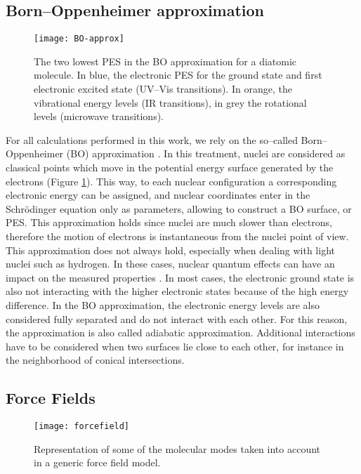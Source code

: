 \subsection*{Born--Oppenheimer approximation}

\begin{figure}[!htbp]
	\centering
 	\texttt{[image: BO-approx]}
	\caption{The two lowest PES in the BO approximation for a diatomic molecule. In blue, the electronic PES for the ground state and first electronic excited state (UV--Vis transitions). In orange, the vibrational energy levels (IR transitions), in grey the rotational levels (microwave transitions).}
	\label{fig:BO-approx}
\end{figure}

For all calculations performed in this work, we rely on the so--called Born--Oppenheimer (BO) approximation \cite{Born1927}. In this treatment, nuclei are considered as classical points which move in the potential energy surface generated by the electrons (Figure \ref{fig:BO-approx}). This way, to each nuclear configuration a corresponding electronic energy can be assigned, and nuclear coordinates enter in the Schr\"{o}dinger equation only as parameters, allowing to construct a BO surface, or PES. This approximation holds since nuclei are much slower than electrons, therefore the motion of electrons is instantaneous from the nuclei point of view. 
This approximation does not always hold, especially when dealing with light nuclei such as hydrogen. In these cases, nuclear quantum effects can have an impact on the measured properties \cite{Ceriotti2016}. In most cases, the electronic ground state is also not interacting with the higher electronic states because of the high energy difference. In the BO approximation, the electronic energy levels are also considered fully separated and do not interact with each other. For this reason, the approximation is also called adiabatic approximation. Additional interactions have to be considered when two surfaces lie close to each other, for instance in the neighborhood of conical intersections. 

\subsection*{Force Fields}

\begin{figure}[!htbp]
	\centering
 	\texttt{[image: forcefield]}
	\caption{Representation of some of the molecular modes taken into account in a generic force field model.}
	\label{fig:forcefield}
\end{figure}

